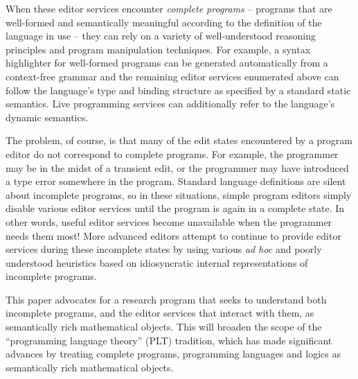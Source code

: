 \documentclass[letterpaper,USenglish]{lipics-v2016}
\begin{document}
When these editor services encounter \emph{complete programs} -- programs that are well-formed and semantically meaningful according to the definition of the language in use -- they can rely on a variety of well-understood reasoning principles and program manipulation techniques. For example, a syntax highlighter for well-formed programs can be generated automatically 
from a context-free grammar \cite{DBLP:conf/tools/KrahnRV08,DBLP:conf/cc/BrandDHJJKKMOSVVV01} and the remaining editor services enumerated above can follow the language's type and binding structure as specified by a standard static
semantics. Live programming services can additionally refer to the language's dynamic semantics.

The problem, of course, is that many of the {edit states} encountered by a program editor do not correspond to complete programs. For example, the programmer may be in the midst of a transient edit, or the programmer may have introduced a type error somewhere in the program. Standard language definitions are silent about incomplete programs, so in these situations, simple program editors simply disable various editor services until the program is again in a complete state. In other words, useful editor services become unavailable when the programmer needs them most!
More advanced editors attempt to continue to provide editor services during these incomplete states by using various \emph{ad hoc} and poorly understood heuristics based on idiosyncratic internal representations of  incomplete programs.

This paper advocates for a research program that seeks to understand both incomplete programs, and the editor services that interact with them, as semantically rich mathematical objects. This will broaden the scope of the ``programming language theory'' (PLT) tradition, which has made significant advances by treating complete programs, programming languages and logics as semantically rich mathematical objects. %
\end{document}
